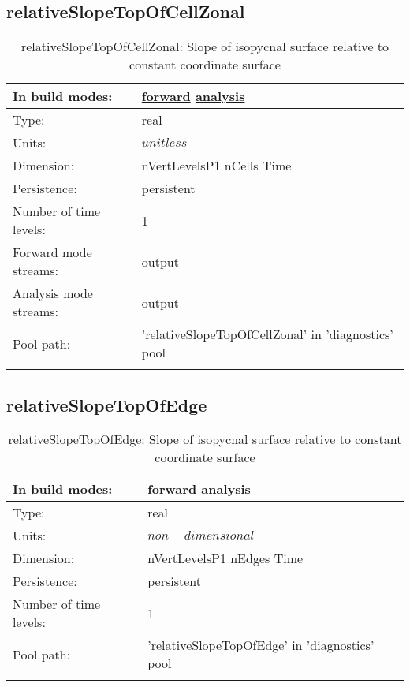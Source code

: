 \subsection[relativeSlopeTopOfCellZonal]{relativeSlopeTopOfCellZonal}
\label{subsec:var_sec_diagnostics_relativeSlopeTopOfCellZonal}
\begin{center}
\begin{longtable}{| p{2.0in} | p{4.0in} |}
        \hline 
        In build modes: & \hyperref[subsec:forward_var_tab_diagnostics]{forward} \hyperref[subsec:analysis_var_tab_diagnostics]{analysis} \\
        \hline 
        Type: & real \\
        \hline 
        Units: & $unitless$ \\
        \hline 
        Dimension: & nVertLevelsP1 nCells Time \\
        \hline 
        Persistence: & persistent \\
        \hline 
        Number of time levels: & 1 \\
        \hline 
		 Forward mode streams: &  output \\
        \hline 
		 Analysis mode streams: &  output \\
        \hline 
            Pool path: & 'relativeSlopeTopOfCellZonal' in 'diagnostics' pool
 \\
		 \hline 
    \caption{relativeSlopeTopOfCellZonal: Slope of isopycnal surface relative to constant coordinate surface}
\end{longtable}
\end{center}
\subsection[relativeSlopeTopOfEdge]{relativeSlopeTopOfEdge}
\label{subsec:var_sec_diagnostics_relativeSlopeTopOfEdge}
\begin{center}
\begin{longtable}{| p{2.0in} | p{4.0in} |}
        \hline 
        In build modes: & \hyperref[subsec:forward_var_tab_diagnostics]{forward} \hyperref[subsec:analysis_var_tab_diagnostics]{analysis} \\
        \hline 
        Type: & real \\
        \hline 
        Units: & $non-dimensional$ \\
        \hline 
        Dimension: & nVertLevelsP1 nEdges Time \\
        \hline 
        Persistence: & persistent \\
        \hline 
        Number of time levels: & 1 \\
        \hline 
            Pool path: & 'relativeSlopeTopOfEdge' in 'diagnostics' pool
 \\
		 \hline 
    \caption{relativeSlopeTopOfEdge: Slope of isopycnal surface relative to constant coordinate surface}
\end{longtable}
\end{center}
